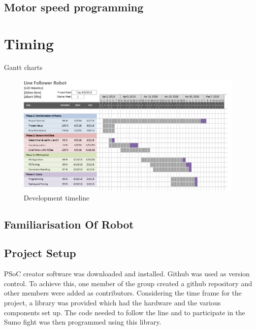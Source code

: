 \documentclass[11pt,a4paper,oneside,article]{memoir}
\begin{document}
\subsection{Motor speed programming}

\section{Timing}
Gantt charts

\begin{figure}[h]
	\centering
	\includegraphics[width=15cm]{illustration/development_timeline}
	\caption{Development timeline}
	\label{fig:dev_timeline}
\end{figure}


\subsection{Familiarisation Of Robot}

\subsection{Project Setup}
PSoC creator software was downloaded and installed. Github was used as version control. To achieve this, one member of the group created a github repository and other members were added as contributors. Considering the time frame for the project, a library was provided which had the hardware and the various components set up. The code needed to follow the line and to participate in the Sumo fight was then programmed using this library. 
\end{document}
